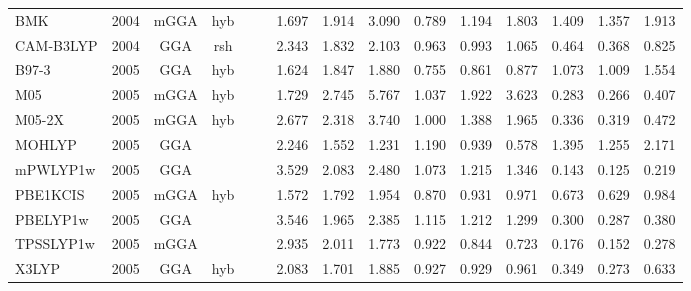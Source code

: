 \begin{landscape}
\begin{longtable}{lcccccrrrrrrrrr}
    BMK              & 2004 & mGGA & hyb      &             &           & 1.697             & 1.914             & 3.090  & 0.789              & 1.194             & 1.803  & 1.409   & 1.357 & 1.913 \\
    CAM-B3LYP        & 2004 & GGA  & rsh      &             &           & 2.343             & 1.832             & 2.103  & 0.963              & 0.993             & 1.065  & 0.464   & 0.368 & 0.825 \\
    B97-3            & 2005 & GGA  & hyb      &             &           & 1.624             & 1.847             & 1.880  & 0.755              & 0.861             & 0.877  & 1.073   & 1.009 & 1.554 \\
    M05              & 2005 & mGGA & hyb      &             &           & 1.729             & 2.745             & 5.767  & 1.037              & 1.922             & 3.623  & 0.283   & 0.266 & 0.407 \\
    M05-2X           & 2005 & mGGA & hyb      &             &           & 2.677             & 2.318             & 3.740  & 1.000              & 1.388             & 1.965  & 0.336   & 0.319 & 0.472 \\
    MOHLYP           & 2005 & GGA  &          &             &           & 2.246             & 1.552             & 1.231  & 1.190              & 0.939             & 0.578  & 1.395   & 1.255 & 2.171 \\
    mPWLYP1w         & 2005 & GGA  &          &             &           & 3.529             & 2.083             & 2.480  & 1.073              & 1.215             & 1.346  & 0.143   & 0.125 & 0.219 \\
    PBE1KCIS         & 2005 & mGGA & hyb      &             &           & 1.572             & 1.792             & 1.954  & 0.870              & 0.931             & 0.971  & 0.673   & 0.629 & 0.984 \\
    PBELYP1w         & 2005 & GGA  &          &             &           & 3.546             & 1.965             & 2.385  & 1.115              & 1.212             & 1.299  & 0.300   & 0.287 & 0.380 \\
    TPSSLYP1w        & 2005 & mGGA &          &             &           & 2.935             & 2.011             & 1.773  & 0.922              & 0.844             & 0.723  & 0.176   & 0.152 & 0.278 \\
    X3LYP            & 2005 & GGA  & hyb      &             &           & 2.083             & 1.701             & 1.885  & 0.927              & 0.929             & 0.961  & 0.349   & 0.273 & 0.633 \\

\end{longtable}
\end{landscape}
